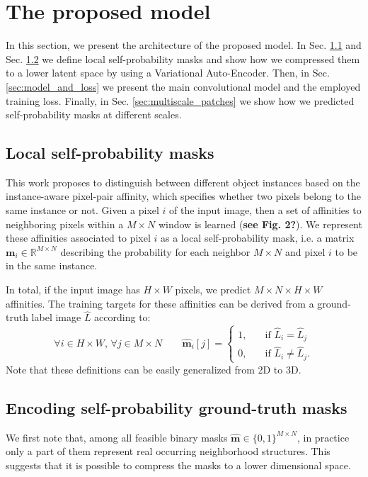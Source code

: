 
\section{The proposed model}\label{sec:model}

In this section, we present the architecture of the proposed model. In Sec. \ref{sec:self_masks} and Sec. \ref{sec:encoding_masks} we define local self-probability masks and show how we compressed them to a lower latent space by using a Variational Auto-Encoder. Then, in Sec. \ref{sec:model_and_loss} we present the main convolutional model and the employed training loss. Finally, in Sec. \ref{sec:multiscale_patches} we show how we predicted self-probability masks at different scales.

\subsection{Local self-probability masks}\label{sec:self_masks}
This work proposes to distinguish between different object instances based on the instance-aware pixel-pair affinity, which specifies whether two pixels belong to the same instance or not.
Given a pixel $i$ of the input image, then a set of affinities to neighboring pixels within a $M\times N$ window is learned (\textbf{see Fig. 2?}). We represent these affinities associated to pixel $i$ as a local self-probability mask, i.e. a matrix $\mathbf{m}_i \in \mathbb{R}^{M\times N}$ describing the probability for each neighbor $M\times N$ and pixel $i$ to be in the same instance.

In total, if the input image has $H\times W$ pixels, we predict $M\times N \times H \times W$ affinities. The training targets for these affinities can be derived from a ground-truth label image $\hat{L}$ according to:
\begin{equation}
\forall i\in H\times W, \, \forall j\in M\times N \qquad \hat{\mathbf{m}}_i[j] = 
\begin{cases}
1, \quad &\text{if } \hat{L}_i = \hat{L}_j \\
0, \quad &\text{if } \hat{L}_i \neq \hat{L}_j. 
\end{cases}
\end{equation}
Note that these definitions can be easily generalized from 2D to 3D.

\subsection{Encoding self-probability ground-truth masks}\label{sec:encoding_masks}
We first note that, among all feasible binary masks $\hat{\mathbf{m}} \in \{0,1\}^{M\times N}$, in practice only a part of them represent real occurring neighborhood structures. 
This suggests that it is possible to compress the masks to a lower dimensional space. 

